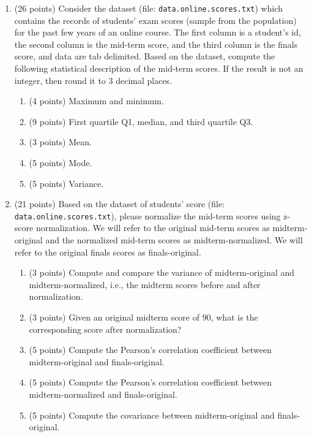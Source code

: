 \documentclass[11pt]{article}
\begin{document}
\newpage

\begin{enumerate}


\item (26 points) Consider the dataset (file: {\tt data.online.scores.txt}) which contains the records of students’ exam scores (sample from the population) for the past few years of an online course. The first column is a student’s id, the second column is the mid-term score, and the third column is the finals score, and data are tab delimited. Based on the dataset, compute the following statistical description of the mid-term scores. If the result is not an integer, then round it to 3 decimal places. 
\begin{enumerate}
\item (4 points) Maximum and minimum.
\item (9 points) First quartile Q1, median, and third quartile Q3.
\item (3 points) Mean.
\item (5 points) Mode.
\item (5 points) Variance.
\end{enumerate}

\item (21 points) Based on the dataset of students’ score (file: {\tt data.online.scores.txt}), please normalize the mid-term scores using z-score normalization. We will refer to the original mid-term scores as {\sf midterm-original} and the normalized mid-term scores as {\sf midterm-normalized}. We will refer to the original finals scores as {\sf finals-original}.
\begin{enumerate}
\item (3 points) Compute and compare the variance of {\sf midterm-original} and {\sf midterm-normalized}, i.e., the midterm scores before and after normalization.
\item (3 points) Given an original midterm score of 90, what is the corresponding score after normalization?
\item (5 points) Compute the Pearson’s correlation coefficient between {\sf midterm-original} and {\sf finals-original}.
\item (5 points) Compute the Pearson’s correlation coefficient between {\sf midterm-normalized} and {\sf finals-original}.
\item (5 points) Compute the covariance between {\sf midterm-original} and {\sf finals-original}. 
\end{enumerate}


\end{enumerate}
\end{document}
